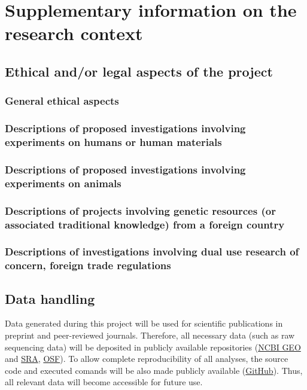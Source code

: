 \section{Supplementary information on the research context}

\subsection{Ethical and/or legal aspects of the project}

\subsubsection{General ethical aspects}

\subsubsection{Descriptions of proposed investigations involving experiments on humans or human materials}

\subsubsection{Descriptions of proposed investigations involving experiments on animals}

\subsubsection{Descriptions of projects involving genetic resources (or associated traditional knowledge) from a foreign country}

\subsubsection{Descriptions of investigations involving dual use research of concern, foreign trade regulations}


\subsection{Data handling}
Data generated during this project will be used for scientific publications in
preprint and peer-reviewed journals. Therefore, all necessary data (such as raw
sequencing data) will be deposited in publicly available repositories
(\href{https://www.ncbi.nlm.nih.gov/geo/}{NCBI GEO} and
\href{https://www.ncbi.nlm.nih.gov/sra}{SRA}, \href{https://osf.io/}{OSF}). To
allow complete reproducibility of all analyses, the source code and executed
comands will be also made publicly available
(\href{https://github.com/}{GitHub}).  Thus, all relevant data will become
accessible for future use. 

